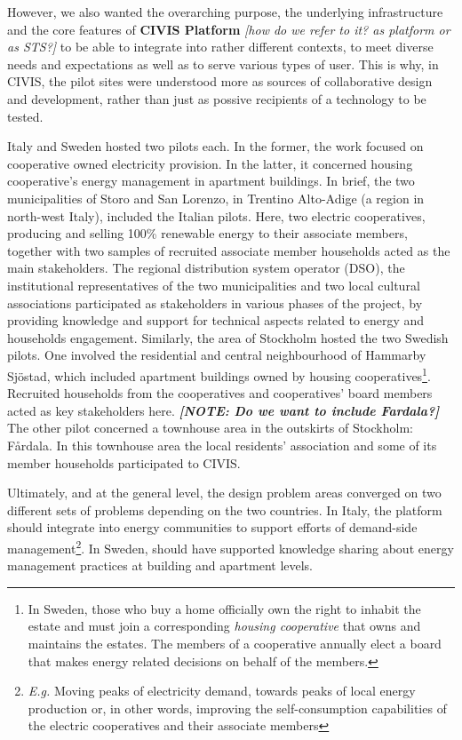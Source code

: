 However, we also wanted the overarching purpose, the underlying infrastructure and the core features of 
\textbf{CIVIS Platform} \textit{[how do we refer to it? as platform or as STS?]} to be able to integrate 
into rather different contexts, to meet diverse needs and expectations as well as to serve various 
types of user. This is why, in CIVIS, the pilot sites were understood more as sources of collaborative design and development,
rather than just as possive recipients of a technology to be tested.  

Italy and Sweden hosted two pilots each. In the former, the work focused on cooperative owned 
electricity provision. In the latter, it concerned housing cooperative's energy management in 
apartment buildings. 
In brief, the two municipalities of Storo and San Lorenzo, in Trentino Alto-Adige (a region in 
north-west Italy), included the Italian pilots. Here, two electric cooperatives, producing and 
selling 100\% renewable energy to their associate members, together with two samples of recruited 
associate member households acted as the main stakeholders. The regional distribution system 
operator (DSO), the institutional representatives of the two municipalities and two local cultural 
associations participated as stakeholders in various phases of the project, by providing knowledge 
and support for technical aspects related to energy and households engagement.
Similarly, the area of Stockholm hosted the two Swedish pilots. One involved the residential and 
central neighbourhood of Hammarby Sj\"{o}stad, which included apartment buildings owned by housing 
cooperatives\footnote{In Sweden, those who buy a home officially own the right to inhabit the estate 
and must join a corresponding \textit{housing cooperative} that owns and maintains the estates. The 
members of a cooperative annually elect a board that makes energy related decisions on behalf of 
the members.}. Recruited households from the cooperatives and cooperatives' board members acted
as key stakeholders here. \textbf{\textit{[NOTE: Do we want to include Fardala?]}} The other pilot 
concerned a townhouse area in the outskirts of Stockholm: F\aa{}rdala. In this townhouse area the 
local residents’ association and some of its member households participated to CIVIS.

Ultimately, and at the general level, the design problem areas converged on two different sets of problems
depending on the two countries. In Italy, the platform should integrate into energy communities to support
efforts of demand-side management\footnote{\textit{E.g.} Moving peaks of electricity demand, towards peaks of local energy
production or, in other words, improving the self-consumption capabilities of the electric cooperatives and
their associate members}. In Sweden, should have supported knowledge sharing about energy management practices at building
and apartment levels.

